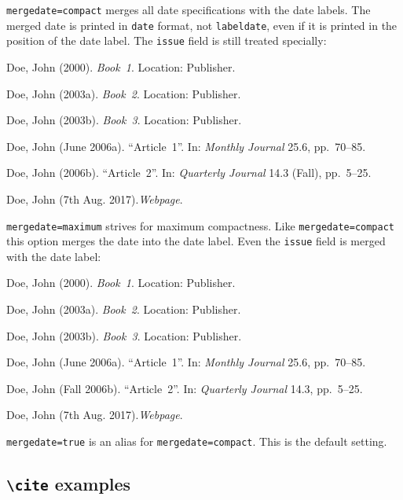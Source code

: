 \documentclass[a4paper]{article}
\newcommand{\cmd}[1]{\texttt{\textbackslash #1}}
\newenvironment{bibsample}
  {\trivlist\samepage
   \setlength{\itemsep}{0pt}}
  {\endtrivlist}
\begin{document}
\texttt{mergedate=compact} merges all date specifications with the
date labels. The merged date is printed in \texttt{date} format,
not \texttt{labeldate}, even if it is printed in the position of
the date label. The \texttt{issue} field is still treated specially:

\begin{bibsample}
\item Doe, John (2000). \emph{Book~1}. Location: Publisher.
\item Doe, John (2003a). \emph{Book~2}. Location: Publisher.
\item Doe, John (2003b). \emph{Book~3}. Location: Publisher.
\item Doe, John (June 2006a). \enquote{Article~1}. In: \emph{Monthly Journal} 25.6, pp.~70--85.
\item Doe, John (2006b). \enquote{Article~2}. In: \emph{Quarterly Journal} 14.3
(Fall), pp.~5--25.
\item Doe, John (7th Aug. 2017).\emph{Webpage}.
\end{bibsample}

\texttt{mergedate=maximum} strives for maximum compactness.
Like \texttt{mergedate=compact} this option merges the date
into the date label.
Even the \texttt{issue} field is merged with the date label:

\begin{bibsample}
\item Doe, John (2000). \emph{Book~1}. Location: Publisher.
\item Doe, John (2003a). \emph{Book~2}. Location: Publisher.
\item Doe, John (2003b). \emph{Book~3}. Location: Publisher.
\item Doe, John (June 2006a). \enquote{Article~1}. In: \emph{Monthly Journal} 25.6, pp.~70--85.
\item Doe, John (Fall 2006b). \enquote{Article~2}. In: \emph{Quarterly Journal} 14.3, pp.~5--25.
\item Doe, John (7th Aug. 2017).\emph{Webpage}.
\end{bibsample}

\texttt{mergedate=true} is an alias for \texttt{mergedate=compact}.
This is the default setting.

\subsection*{\cmd{cite} examples}

\cite{companion}
\end{document}
